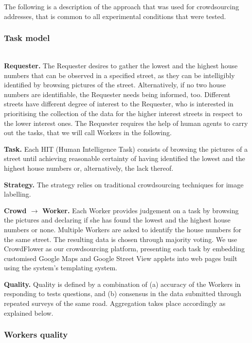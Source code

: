 The following is a description of the approach that was used for crowdsourcing addresses, that is common to all experimental conditions that were tested.

\subsubsection{Task model} \leavevmode \\ %

\textbf{Requester.} The Requester desires to gather the lowest and the highest house numbers that can be observed in a specified street, as they can be intelligibly identified by browsing pictures of the street. Alternatively, if no two house numbers are identifiable, the Requester needs being informed, too. Different streets have different degree of interest to the Requester, who is interested in prioritising the collection of the data for the higher interest streets in respect to the lower interest ones. The Requester requires the help of human agents to carry out the tasks, that we will call Workers in the following.

\textbf{Task.} Each HIT (Human Intelligence Task) consists of browsing the pictures of a street until achieving reasonable certainty of having identified the lowest and the highest house numbers or, alternatively, the lack thereof.

\textbf{Strategy.} 
The strategy relies on traditional crowdsourcing techniques for image labelling.

\textbf{Crowd $\rightarrow$ Worker.} Each Worker provides judgement on a task by browsing the pictures and declaring if she has found the lowest and the highest house numbers or none. Multiple Workers are asked to identify the house numbers for the same street. The resulting data is chosen through majority voting. We use CrowdFlower as our crowdsourcing platform, presenting each task by embedding customised Google Maps and Google Street View applets into web pages built using the system's templating system. 

\textbf{Quality.} Quality is defined by a combination of (a) accuracy of the Workers in responding to tests questions, and (b) consensus in the data submitted through repeated surveys of the same road. Aggregation takes place accordingly as explained below.

\subsubsection{Workers quality}
    
